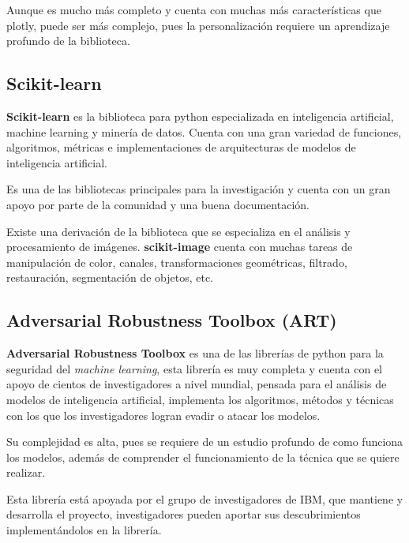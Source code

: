 Aunque es mucho más completo y cuenta con muchas más características que plotly, puede ser más complejo, pues la personalización requiere un aprendizaje profundo de la biblioteca.

\subsection{Scikit-learn}

\textbf{Scikit-learn} es la biblioteca para python especializada en inteligencia artificial, machine learning y minería de datos. Cuenta con una gran variedad de funciones, algoritmos, métricas e implementaciones de arquitecturas de modelos de inteligencia artificial.

Es una de las bibliotecas principales para la investigación  y cuenta con un gran apoyo por parte de la comunidad y una buena documentación.

Existe una derivación de la biblioteca que se especializa en el análisis y procesamiento de imágenes. \textbf{scikit-image} cuenta con muchas tareas de manipulación de color, canales, transformaciones geométricas, filtrado, restauración, segmentación de objetos, etc.

\subsection{Adversarial Robustness Toolbox (ART)}

\textbf{Adversarial Robustness Toolbox} es una de las librerías de python para la seguridad del \textit{machine learning}, esta librería es muy completa y cuenta con el apoyo de cientos de investigadores a nivel mundial, pensada para el análisis de modelos de inteligencia artificial, implementa los algoritmos, métodos y técnicas con los que los investigadores logran evadir o atacar los modelos.

Su complejidad es alta, pues se requiere de un estudio profundo de como funciona los modelos, además de comprender el funcionamiento de la técnica que se quiere realizar.

Esta librería está apoyada por el grupo de investigadores de IBM, que mantiene y desarrolla el proyecto, investigadores pueden aportar sus descubrimientos implementándolos en la librería.

